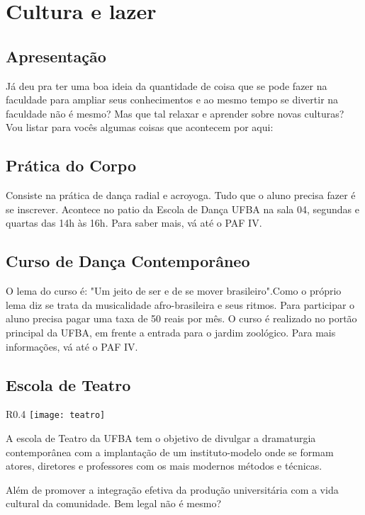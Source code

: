 \section{Cultura e lazer}
	            \subsection{Apresentação}
	                Já deu pra ter uma boa ideia da quantidade de coisa que se pode fazer na faculdade para ampliar seus conhecimentos e ao mesmo tempo se divertir na faculdade não é mesmo? Mas que tal relaxar e aprender sobre novas culturas? Vou listar para vocês algumas coisas que acontecem por aqui:

\subsection {Prática do Corpo}

Consiste na prática de dança radial e acroyoga.  Tudo que o aluno precisa fazer é se inscrever. Acontece no patio da Escola de Dança UFBA na sala 04, segundas e quartas das 14h às 16h. Para saber mais, vá até o PAF IV.

\subsection {Curso de Dança Contemporâneo}

O lema do curso é: "Um jeito de ser e de se mover brasileiro".Como o próprio lema diz se trata da musicalidade afro-brasileira e seus ritmos. Para participar o aluno precisa pagar uma taxa de 50 reais por mês. O curso é realizado no portão principal da UFBA, em frente a entrada para o jardim zoológico. Para mais informações, vá até o PAF IV.

\subsection {Escola de Teatro}

\begin{wrapfigure}{R}{0.4\textwidth}
	\centering	\texttt{[image: teatro]}
\end{wrapfigure}

A escola de Teatro da UFBA tem o objetivo de divulgar a dramaturgia contemporânea com a implantação de um instituto-modelo onde se formam atores, diretores e professores com os mais modernos métodos e técnicas. 

Além de promover a integração efetiva da produção universitária com a vida cultural da comunidade. Bem legal não é mesmo?

